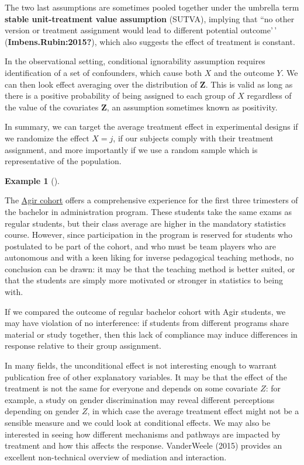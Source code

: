 \documentclass[
  11pt,
  letterpaper,
]{scrbook}
\theoremstyle{definition}
\newtheorem{example}{Example}[chapter]
\theoremstyle{remark}
\begin{document}
The two last assumptions are sometimes pooled together under the
umbrella term \textbf{stable unit-treatment value assumption} (SUTVA),
implying that ``no other version or treatment assignment would lead to
different potential outcome'\,' (\textbf{Imbens.Rubin:2015?}), which
also suggests the effect of treatment is constant.

In the observational setting, conditional ignorability assumption
requires identification of a set of confounders, which cause both \(X\)
and the outcome \(Y\). We can then look effect averaging over the
distribution of \(\boldsymbol{Z}\). This is valid as long as there is a
positive probability of being assigned to each group of \(X\) regardless
of the value of the covariates \(\boldsymbol{Z}\), an assumption
sometimes known as positivity.

In summary, we can target the average treatment effect in experimental
designs if we randomize the effect \(X=j\), if our subjects comply with
their treatment assignment, and more importantly if we use a random
sample which is representative of the population.

\begin{example}[]\protect\hypertarget{exm-nonrandomtreatment}{}\label{exm-nonrandomtreatment}

The
\href{https://www.hec.ca/programmes/baccalaureats/parcours-agir/index.html}{Agir
cohort} offers a comprehensive experience for the first three trimesters
of the bachelor in administration program. These students take the same
exams as regular students, but their class average are higher in the
mandatory statistics course. However, since participation in the program
is reserved for students who postulated to be part of the cohort, and
who must be team players who are autonomous and with a keen liking for
inverse pedagogical teaching methods, no conclusion can be drawn: it may
be that the teaching method is better suited, or that the students are
simply more motivated or stronger in statistics to being with.

If we compared the outcome of regular bachelor cohort with Agir
students, we may have violation of no interference: if students from
different programs share material or study together, then this lack of
compliance may induce differences in response relative to their group
assignment.

\end{example}

In many fields, the unconditional effect is not interesting enough to
warrant publication free of other explanatory variables. It may be that
the effect of the treatment is not the same for everyone and depends on
some covariate \(Z\): for example, a study on gender discrimination may
reveal different perceptions depending on gender \(Z\), in which case
the average treatment effect might not be a sensible measure and we
could look at conditional effects. We may also be interested in seeing
how different mechanisms and pathways are impacted by treatment and how
this affects the response. VanderWeele (2015) provides an excellent
non-technical overview of mediation and interaction.
\end{document}
